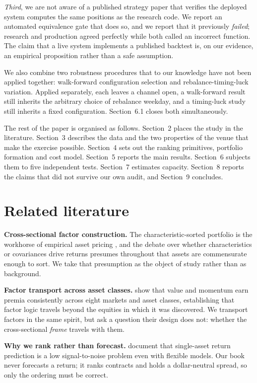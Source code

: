 \documentclass[11pt,letterpaper]{article}
\begin{document}
\emph{Third}, we are not aware of a published strategy paper that verifies the
deployed system computes the same positions as the research code. We report an
automated equivalence gate that does so, and we report that it previously
\emph{failed}; research and production agreed perfectly while both called an
incorrect function. The claim that a live system implements a published backtest
is, on our evidence, an empirical proposition rather than a safe assumption.

We also combine two robustness procedures that to our knowledge have not been
applied together: walk-forward configuration selection and rebalance-timing-luck
variation. Applied separately, each leaves a channel open, a walk-forward result
still inherits the arbitrary choice of rebalance weekday, and a timing-luck study
still inherits a fixed configuration. Section~6.1 closes both simultaneously.

The rest of the paper is organised as follows. Section~2 places the study in the
literature. Section~3 describes the data and the two properties of the venue that
make the exercise possible. Section~4 sets out the ranking primitives, portfolio
formation and cost model. Section~5 reports the main results. Section~6 subjects
them to five independent tests. Section~7 estimates capacity.
Section~8 reports the claims that did not survive our own audit, and Section~9
concludes.

\section{Related literature}

\textbf{Cross-sectional factor construction.} The characteristic-sorted portfolio
is the workhorse of empirical asset pricing \citep{famafrench1993}, and the debate
over whether characteristics or covariances drive returns \citep{danieltitman1997}
presumes throughout that assets are commensurate enough to sort. We take that
presumption as the object of study rather than as background.

\textbf{Factor transport across asset classes.} \citet{asness2013} show that
value and momentum earn premia consistently across eight markets and asset
classes, establishing that factor logic travels beyond the equities in which it
was discovered. We transport factors in the same spirit, but ask a question their
design does not: whether the cross-sectional \emph{frame} travels with them.

\textbf{Why we rank rather than forecast.} \citet{gu2020} document that
single-asset return prediction is a low signal-to-noise problem even with
flexible models. Our book never forecasts a return; it ranks contracts and holds
a dollar-neutral spread, so only the ordering must be correct.
\end{document}
